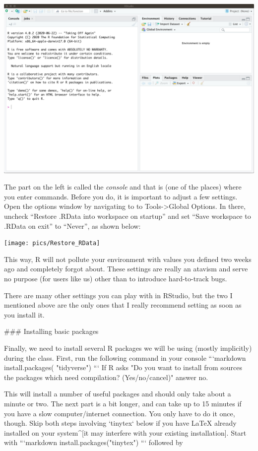 \documentclass[
]{book}
\theoremstyle{definition}
\theoremstyle{definition}
\theoremstyle{definition}
\theoremstyle{definition}
\theoremstyle{remark}
\begin{document}
\begin{center}\includegraphics[width=1\linewidth,style="padding:10px"]{pics/RStudio_IDE} \end{center}

The part on the left is called the \emph{console} and that is (one of the places) where you enter commands. Before you do, it is important to adjust a few settings. Open the options window by navigating to to Tools-\textgreater Global Options. In there, uncheck ``Restore .RData into workspace on startup'' and set ``Save workspace to .RData on exit'' to ``Never'', as shown below:

\begin{center}\texttt{[image: pics/Restore\_RData]} \end{center}

This way, R will not pollute your environment with values you defined two weeks ago and completely forgot about. These settings are really an atavism and serve no purpose (for users like us) other than to introduce hard-to-track bugs. 

There are many other settings you can play with in RStudio, but the two I mentioned above are the only ones that I really recommend setting as soon as you install it. 


### Installing basic packages

Finally, we need to install several R packages we will be using (mostly implicitly) during the class. First, run the following command in your console
```markdown
install.packages( "tidyverse")
```
If R asks "Do you want to install from sources the packages which need compilation? (Yes/no/cancel)" answer no.

This will install a number of useful packages and should only take about a minute or two. The next part is a bit longer, and can take up to 15 minutes if you have a slow computer/internet connection.
You only have to do it once, though. Skip both steps involving `tinytex` below if you have LaTeX already installed on your system^[it may interfere with your existing installation].  Start with 
```markdown
install.packages("tinytex")
```
followed by 
\end{document}
